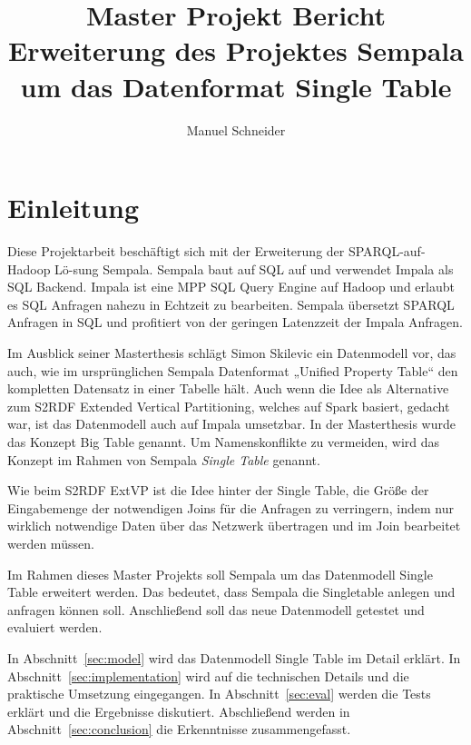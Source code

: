 \documentclass[
  a4paper,
  12pt,
  oneside,
  parskip=half,
  headsepline,
]{scrartcl}
\begin{document}
\title{Master Projekt Bericht\\[1em] \large Erweiterung des Projektes Sempala\\ um das Datenformat Single Table}
\author{Manuel Schneider}
\maketitle
\clearpage
\tableofcontents
\clearpage

\section{Einleitung}

Diese Projektarbeit beschäftigt sich mit der Erweiterung der SPARQL-auf-Hadoop Lö-sung Sempala.
Sempala baut auf SQL auf und verwendet Impala als SQL Backend.
Impala ist eine MPP SQL Query Engine auf Hadoop und erlaubt es SQL Anfragen nahezu in Echtzeit zu bearbeiten.
Sempala übersetzt SPARQL Anfragen in SQL und profitiert von der geringen Latenzzeit der Impala Anfragen.

Im Ausblick seiner Masterthesis \cite{skilevic} schlägt Simon Skilevic ein
Datenmodell vor, das auch, wie im ursprünglichen Sempala Datenformat „Unified
Property Table“ den kompletten Datensatz in einer Tabelle hält. Auch wenn die
Idee als Alternative zum S2RDF Extended Vertical Partitioning, welches auf Spark
basiert, gedacht war, ist das Datenmodell auch auf Impala umsetzbar. In der 
Masterthesis wurde das Konzept Big Table genannt. Um Namenskonflikte zu vermeiden,
wird das Konzept im Rahmen von Sempala \textit{Single Table} genannt.

Wie beim S2RDF ExtVP ist die Idee hinter der Single Table, die Größe der 
Eingabemenge der notwendigen Joins für die Anfragen zu verringern, indem nur 
wirklich notwendige Daten über das Netzwerk übertragen und im Join bearbeitet 
werden müssen.

Im Rahmen dieses Master Projekts soll Sempala um das Datenmodell Single Table 
erweitert werden. Das bedeutet, dass Sempala die Singletable anlegen und anfragen 
können soll. Anschließend soll das neue Datenmodell getestet und evaluiert werden.

In Abschnitt~\ref{sec:model} wird das Datenmodell Single Table im Detail
erklärt. In Abschnitt~\ref{sec:implementation} wird auf die technischen Details
und die praktische Umsetzung eingegangen. In Abschnitt~\ref{sec:eval} werden die
Tests erklärt und die Ergebnisse diskutiert. Abschließend werden
in Abschnitt~\ref{sec:conclusion} die Erkenntnisse zusammengefasst.
\end{document}
